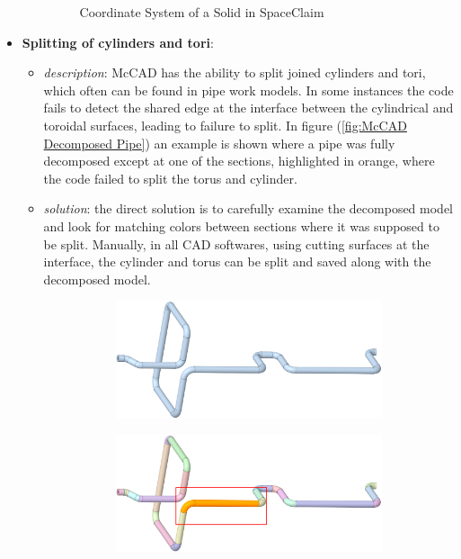 \documentclass[12pt, a4paper, titlepage]{article}
\begin{document}
\begin{itemize}
\begin{itemize}
\begin{figure}[h!]
			\caption{Coordinate System of a Solid in SpaceClaim}
			\label{fig:Solid Coord}
		\end{figure}
	\end{itemize} 
	\item \textbf{Splitting of cylinders and tori}:
	\begin{itemize}
		\item \emph{description}: McCAD has the ability to split joined cylinders and tori, which often can be found in pipe work models. In some instances the code fails to detect the shared edge at the interface between the cylindrical and toroidal surfaces, leading to failure to split. In figure (\ref{fig:McCAD Decomposed Pipe}) an example is shown where a pipe was fully decomposed except at one of the sections, highlighted in orange, where the code failed to split the torus and cylinder.
		\item \emph{solution}: the direct solution is to carefully examine the decomposed model and look for matching colors between sections where it was supposed to be split. Manually, in all CAD softwares, using cutting surfaces at the interface, the cylinder and torus can be split and saved along with the decomposed model.
		\begin{figure}[h!]
			\centering
			\begin{subfigure}{.5\textwidth}
				\centering
				\includegraphics[width=.75\linewidth]{figures/issues_pipe_torus_a.png}
				\caption{}
				\label{fig:a}
			\end{subfigure}%
			\begin{subfigure}{.5\textwidth}
				\centering
				\includegraphics[width=.75\linewidth]{figures/issues_pipe_torus_b.png}

\end{subfigure}
\end{figure}
\end{itemize}
\end{itemize}
\end{document}
